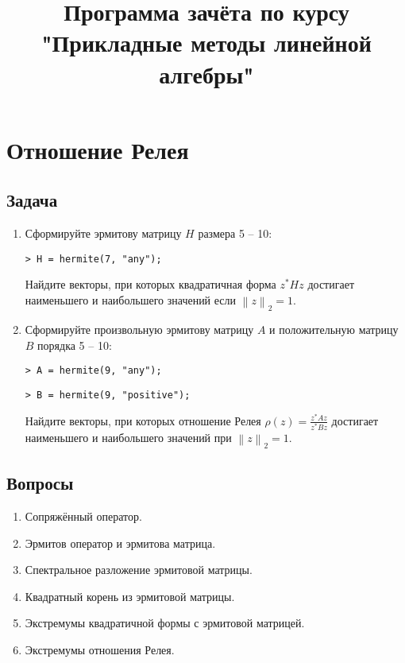 \documentclass[a4paper,12pt]{article}
\newenvironment{Matlab}{\par \vspace{0.2cm}}{\vspace{0.2cm} \par}
\newcommand{\Mcommand}[1]{\noindent \texttt{> #1} \par}
\newcommand{\matlab}[1]{\begin{Matlab} \Mcommand{#1} \end{Matlab}}
\newcommand{\snorm}[1]{\left\| #1 \right\|_2}
\begin{document}
\title{Программа зачёта по курсу \\ "Прикладные методы линейной алгебры"}
\date{}
\author{}
\maketitle

\section{Отношение Релея}

\subsection{Задача}

\begin{enumerate}
    \item Сформируйте эрмитову матрицу $H$ размера 5 -- 10:
          \matlab{H = hermite(7, "any");}
          Найдите векторы, при которых квадратичная форма $z^* H z$ достигает наименьшего и наибольшего значений если $\snorm{z}=1$.

    \item Сформируйте произвольную эрмитову матрицу $A$ и положительную матрицу $B$ порядка 5 -- 10:
          \begin{Matlab}
              \Mcommand{A = hermite(9, "any");}
              \Mcommand{B = hermite(9, "positive");}
          \end{Matlab}
          Найдите векторы, при которых отношение Релея $\rho(z) = \frac{z^* A z}{z^* B z}$ достигает наименьшего и наибольшего значений
          при $\snorm{z}=1$.
\end{enumerate}

\subsection{Вопросы}

\begin{enumerate}
    \item Сопряжённый оператор.
    \item Эрмитов оператор и эрмитова матрица.
    \item Спектральное разложение эрмитовой матрицы.
    \item Квадратный корень из эрмитовой матрицы.
    \item Экстремумы квадратичной формы с эрмитовой матрицей.
    \item Экстремумы отношения Релея.
\end{enumerate}
\end{document}
